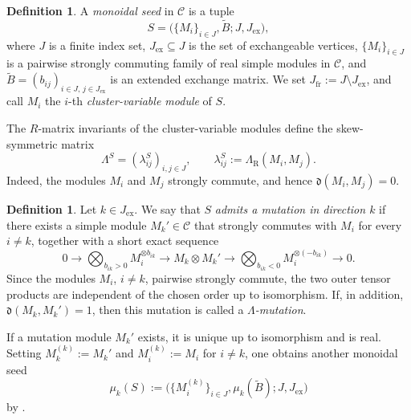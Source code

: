 \documentclass[12pt, reqno]{amsart}
\theoremstyle{plain}
\theoremstyle{definition}
\newtheorem{definition}[theorem]{Definition}
\numberwithin{equation}{section}
\newcommand{\LambdaR}{\Lambda_{\mathrm R}}
\begin{document}
\begin{definition}\label{def:monoidal-seed}
    A \emph{monoidal seed} in \(\mathscr C\) is a tuple
    \begin{equation}\label{eq:monoidal-seed}
        S=\bigl(
            \{M_i\}_{i\in J},\widetilde B;
            J,J_{\mathrm{ex}}
        \bigr),
    \end{equation}
    where \(J\) is a finite index set,
    \(J_{\mathrm{ex}}\subseteq J\) is the set of exchangeable vertices,
    \(\{M_i\}_{i\in J}\) is a pairwise strongly commuting family of real
    simple modules in \(\mathscr C\), and
    \(\widetilde B=(b_{ij})_{i\in J,\,j\in J_{\mathrm{ex}}}\) is an
    extended exchange matrix. We set
    \(J_{\mathrm{fr}}:=J\setminus J_{\mathrm{ex}}\), and call \(M_i\) the
    \(i\)-th \emph{cluster-variable module} of \(S\).
\end{definition}

The \(R\)-matrix invariants of the cluster-variable modules define the
skew-symmetric matrix
\begin{equation}\label{eq:Lambda-monoidal-seed}
    \Lambda^S=(\lambda_{ij}^S)_{i,j\in J},
    \qquad
    \lambda_{ij}^S:=\LambdaR(M_i,M_j).
\end{equation}
Indeed, the modules \(M_i\) and \(M_j\) strongly commute, and hence
\(\mathfrak d(M_i,M_j)=0\).

\begin{definition}\label{def:monoidal-mutation}
    Let \(k\in J_{\mathrm{ex}}\). We say that \(S\) \emph{admits a
    mutation in direction \(k\)} if there exists a simple module
    \(M_k'\in\mathscr C\) that strongly commutes with \(M_i\) for every
    \(i\neq k\), together with a short exact sequence
    \begin{equation}\label{eq:monoidal-mutation}
        0\longrightarrow
        \bigotimes_{b_{ik}>0}M_i^{\otimes b_{ik}}
        \longrightarrow M_k\otimes M_k'
        \longrightarrow
        \bigotimes_{b_{ik}<0}M_i^{\otimes(-b_{ik})}
        \longrightarrow0.
    \end{equation}
    Since the modules \(M_i\), \(i\neq k\), pairwise strongly commute,
    the two outer tensor products are independent of the chosen order up to
    isomorphism. If, in addition, \(\mathfrak d(M_k,M_k')=1\), then this
    mutation is called a \emph{\(\Lambda\)-mutation}.
\end{definition}

If a mutation module \(M_k'\) exists, it is unique up to isomorphism and is
real. Setting \(M_k^{(k)}:=M_k'\) and \(M_i^{(k)}:=M_i\) for \(i\neq k\),
one obtains another monoidal seed
\begin{equation}\label{eq:mutated-monoidal-seed}
    \mu_k(S)
    :=\bigl(
        \{M_i^{(k)}\}_{i\in J},
        \mu_k(\widetilde B);
        J,J_{\mathrm{ex}}
    \bigr)
\end{equation}
by \cite[Lemma~4.7]{kashiwara2024monoidal}.
\end{document}
